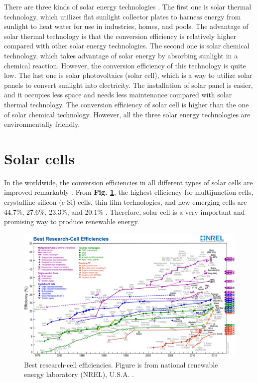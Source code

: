 \documentclass[a4paper, 12pt, titlepage,oneside,drop]{kthesis}
\begin{document}
There are three kinds of solar energy technologies \cite{boyle2004renewable,Chiras201007}. The first one is solar thermal technology, which utilizes flat sunlight collector plates to harness energy from sunlight to heat water
for use in industries, homes, and pools. The advantage of solar thermal technology is that the conversion efficiency is relatively higher compared with other solar energy technologies. The second one is 
solar chemical technology, which takes advantage of solar energy by absorbing sunlight in a chemical reaction. However, the conversion efficiency of this technology is quite low. The last one is solar photovoltaics (solar cell), which is a way
to utilize solar panels to convert sunlight into electricity. The installation of solar panel is easier, and it occupies less space and needs less maintenance compared with solar thermal technology.
The conversion efficiency of solar cell is higher than the one of solar chemical technology. However, all the three solar energy technologies are environmentally friendly.


\section{Solar cells}
In the worldwide, the conversion efficiencies in all different types of solar cells are improved remarkably \cite{nrel}. From \textbf{Fig. \ref{nrel}}, the highest efficiency for multijunction cells, crystalline silicon (c-Si) cells,
thin-film technologies, and new emerging cells are 44.7\%, 27.6\%, 23.3\%, and 20.1\% \cite{dimroth2014wafer, jones2009new, ward2014cu, green2015solar}. Therefore, solar cell is a very important and promising way to produce renewable energy.


\begin{figure}
\captionsetup{width=1\textwidth}
\centering
\includegraphics[scale=0.6]{efficiency_chart.jpg}
\caption{Best research-cell efficiencies. Figure is from national renewable energy laboratory (NREL), U.S.A. \cite{nrel}.}
\label{nrel}
\end{figure}
\end{document}
